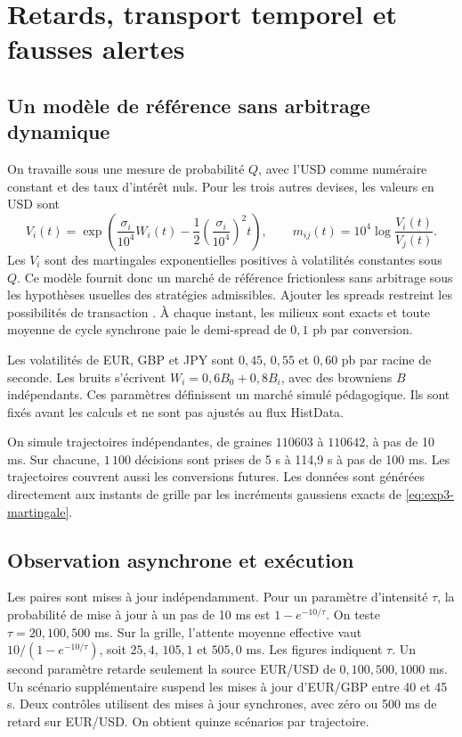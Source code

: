 \section{Retards, transport temporel et fausses alertes}
\label{sec:experience-trois}

\subsection{Un modèle de référence sans arbitrage dynamique}

On travaille sous une mesure de probabilité \(Q\), avec l'USD comme numéraire constant et des taux d'intérêt nuls. Pour les trois autres devises, les valeurs en USD sont
\begin{equation}
 V_i(t)=\exp\!\left(\frac{\sigma_i}{10^4}W_i(t)
                     -\frac12\left(\frac{\sigma_i}{10^4}\right)^2t\right),
 \qquad m_{ij}(t)=10^4\log\frac{V_i(t)}{V_j(t)} .
 \label{eq:exp3-martingale}
\end{equation}
Les \(V_i\) sont des martingales exponentielles positives à volatilités constantes sous \(Q\). Ce modèle fournit donc un marché de référence frictionless sans arbitrage sous les hypothèses usuelles des stratégies admissibles. Ajouter les spreads restreint les possibilités de transaction \cite{delbaen}. À chaque instant, les milieux sont exacts et toute moyenne de cycle synchrone paie le demi-spread de \(0{,}1\) pb par conversion.

Les volatilités de EUR, GBP et JPY sont \(0{,}45\), \(0{,}55\) et \(0{,}60\) pb par racine de seconde. Les bruits s'écrivent \(W_i=0{,}6B_0+0{,}8B_i\), avec des browniens \(B\) indépendants. Ces paramètres définissent un marché simulé pédagogique. Ils sont fixés avant les calculs et ne sont pas ajustés au flux HistData.

On simule \ExpTroisRepliques{} trajectoires indépendantes, de graines \(110603\) à \(110642\), à pas de 10 ms. Sur chacune, \(1\,100\) décisions sont prises de 5 s à 114,9 s à pas de 100 ms. Les trajectoires couvrent aussi les conversions futures. Les données sont générées directement aux instants de grille par les incréments gaussiens exacts de \eqref{eq:exp3-martingale}.

\subsection{Observation asynchrone et exécution}

Les paires sont mises à jour indépendamment. Pour un paramètre d'intensité \(\tau\), la probabilité de mise à jour à un pas de 10 ms est \(1-e^{-10/\tau}\). On teste \(\tau=20,100,500\) ms. Sur la grille, l'attente moyenne effective vaut \(10/(1-e^{-10/\tau})\), soit \(25{,}4\), \(105{,}1\) et \(505{,}0\) ms. Les figures indiquent \(\tau\). Un second paramètre retarde seulement la source EUR/USD de \(0,100,500,1000\) ms. Un scénario supplémentaire suspend les mises à jour d'EUR/GBP entre 40 et 45 s. Deux contrôles utilisent des mises à jour synchrones, avec zéro ou 500 ms de retard sur EUR/USD. On obtient quinze scénarios par trajectoire.

